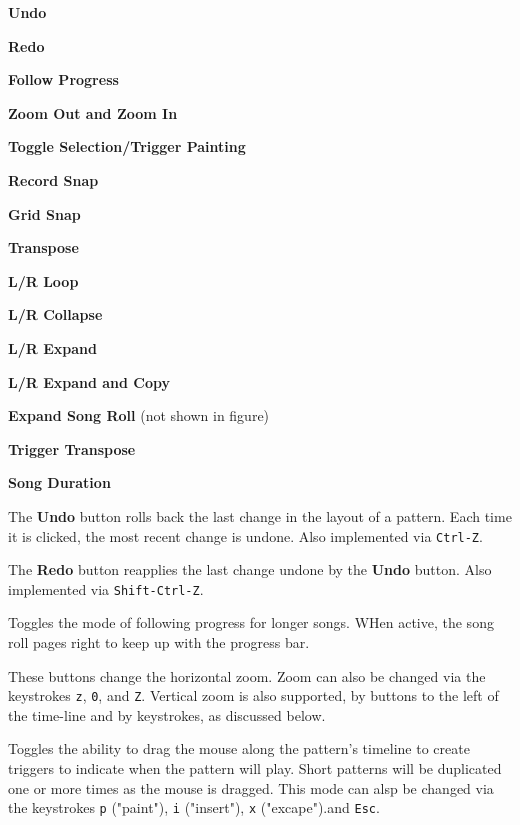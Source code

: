    \begin{enumber}
      \item \textbf{Undo}
      \item \textbf{Redo}
      \item \textbf{Follow Progress}
      \item \textbf{Zoom Out and Zoom In}
      \item \textbf{Toggle Selection/Trigger Painting}
      \item \textbf{Record Snap}
      \item \textbf{Grid Snap}
      \item \textbf{Transpose}
      \item \textbf{L/R Loop}
      \item \textbf{L/R Collapse}
      \item \textbf{L/R Expand}
      \item \textbf{L/R Expand and Copy}
      \item \textbf{Expand Song Roll} (not shown in figure)
      \item \textbf{Trigger Transpose}
      \item \textbf{Song Duration}
   \end{enumber}

   \setcounter{ItemCounter}{0}      %

   The \textbf{Undo} button rolls back the last change in the layout of a
   pattern.  Each time it is clicked, the most recent change is undone.
   Also implemented via \texttt{Ctrl-Z}.

   The \textbf{Redo} button reapplies the last change undone by
   the \textbf{Undo} button.
   Also implemented via \texttt{Shift-Ctrl-Z}.

   Toggles the mode of following progress
   for longer songs.  WHen active, the song roll pages right to keep up with
   the progress bar.

   These buttons change the horizontal zoom.
   Zoom can also be changed via the keystrokes \texttt{z}, \texttt{0},
   and \texttt{Z}.
   Vertical zoom is also supported, by buttons to the left of the time-line and
   by keystrokes, as discussed below.

   Toggles the ability
   to drag the mouse along the pattern's timeline to create triggers
   to indicate when the pattern will play.
   Short patterns will be duplicated one or more times as
   the mouse is dragged.
   This mode can alsp be changed via the keystrokes \texttt{p} ("paint"),
   \texttt{i} ("insert"), \texttt{x} ("excape").and \texttt{Esc}.


